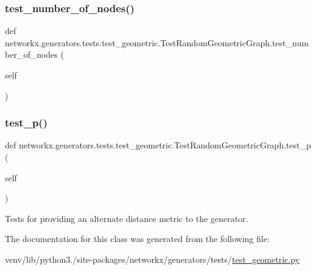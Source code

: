 \subsubsection{\texorpdfstring{test\+\_\+number\+\_\+of\+\_\+nodes()}{test\_number\_of\_nodes()}}
{\footnotesize\ttfamily def networkx.\+generators.\+tests.\+test\+\_\+geometric.\+Test\+Random\+Geometric\+Graph.\+test\+\_\+number\+\_\+of\+\_\+nodes (\begin{DoxyParamCaption}\item[{}]{self }\end{DoxyParamCaption})}

\mbox{\label{classnetworkx_1_1generators_1_1tests_1_1test__geometric_1_1TestRandomGeometricGraph_a17479c86622c65ce44e7ac25d511a8f6}} 
\subsubsection{\texorpdfstring{test\+\_\+p()}{test\_p()}}
{\footnotesize\ttfamily def networkx.\+generators.\+tests.\+test\+\_\+geometric.\+Test\+Random\+Geometric\+Graph.\+test\+\_\+p (\begin{DoxyParamCaption}\item[{}]{self }\end{DoxyParamCaption})}

\begin{DoxyVerb}Tests for providing an alternate distance metric to the
generator.\end{DoxyVerb}
 

The documentation for this class was generated from the following file\+:\begin{DoxyCompactItemize}
\item 
venv/lib/python3./site-\/packages/networkx/generators/tests/\hyperlink{test__geometric_8py}{test\+\_\+geometric.\+py}\end{DoxyCompactItemize}

